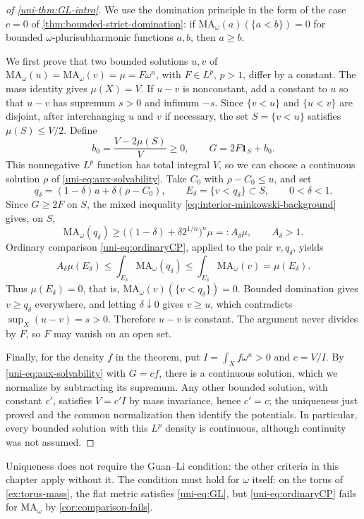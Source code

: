 \begin{proof}[of \cref{uni-thm:GL-intro}]
We use the domination principle in the form of the case $c=0$ of \cref{thm:bounded-strict-domination}: if $\mathrm{MA}_\omega(a)(\{a<b\})=0$ for bounded $\omega$-plurisubharmonic functions $a,b$, then $a\geq b$.

We first prove that two bounded solutions $u,v$ of $\mathrm{MA}_\omega(u)=\mathrm{MA}_\omega(v)=\mu=F\omega^n$, with
$F\in L^p$, $p>1$, differ by a constant.  The mass identity gives $\mu(X)=V$.
If $u-v$ is nonconstant, add a constant to $u$ so that $u-v$
has supremum $s>0$ and infimum $-s$.  Since $\{v<u\}$ and $\{u<v\}$ are disjoint, after interchanging $u$ and $v$ if
necessary, the set $S=\{v<u\}$ satisfies $\mu(S)\leq V/2$.
Define
\[
 b_0=\frac{V-2\mu(S)}V\geq0,
 \qquad G=2F\mathbf1_S+b_0.
\]
This nonnegative $L^p$ function has total integral $V$, so we can choose a
continuous solution $\rho$ of \eqref{uni-eq:aux-solvability}.
Take $C_0$ with $\rho-C_0\leq u$, and set
\[
 q_\delta=(1-\delta)u+\delta(\rho-C_0),\qquad
 E_\delta=\{v<q_\delta\}\subset S,
 \qquad 0<\delta<1.
\]
Since $G\geq2F$ on $S$, the mixed inequality \eqref{eq:interior-minkowski-background} gives, on $S$,
\begin{equation}\label{uni-eq:mixed-bounded}
 \mathrm{MA}_\omega(q_\delta)\geq
 \bigl((1-\delta)+\delta2^{1/n}\bigr)^n\mu=:A_\delta\mu,
 \qquad A_\delta>1.
\end{equation}
Ordinary comparison \eqref{uni-eq:ordinaryCP}, applied to the pair $v,q_\delta$, yields
\[
 A_\delta\mu(E_\delta)
 \leq\int_{E_\delta}\mathrm{MA}_\omega(q_\delta)
 \leq\int_{E_\delta}\mathrm{MA}_\omega(v)=\mu(E_\delta).
\]
Thus $\mu(E_\delta)=0$, that is, $\mathrm{MA}_\omega(v)(\{v<q_\delta\})=0$.  Bounded domination gives
$v\geq q_\delta$ everywhere, and letting $\delta\downarrow0$ gives
$v\geq u$, which contradicts $\sup_X(u-v)=s>0$.  Therefore $u-v$
is constant.  The argument never divides by $F$, so $F$ may vanish on an open set.

Finally, for the density $f$ in the theorem, put
$I=\int_Xf\omega^n>0$ and $c=V/I$.  By \eqref{uni-eq:aux-solvability} with
$G=cf$, there is a continuous solution, which we normalize by subtracting its supremum.  Any other bounded
solution, with constant $c'$, satisfies $V=c'I$ by mass invariance, hence $c'=c$;
the uniqueness just proved and the common normalization then identify the
potentials.  In particular, every bounded solution with this $L^p$
density is continuous, although continuity was not assumed.
\end{proof}

\begin{remark}
Uniqueness does not require the Guan--Li condition: the other criteria in this chapter apply without it. The condition must hold for $\omega$ itself: on the torus of \cref{ex:torus-mass}, the flat metric satisfies \eqref{uni-eq:GL}, but \eqref{uni-eq:ordinaryCP} fails for $\mathrm{MA}_\omega$ by \cref{cor:comparison-fails}.
\end{remark}
